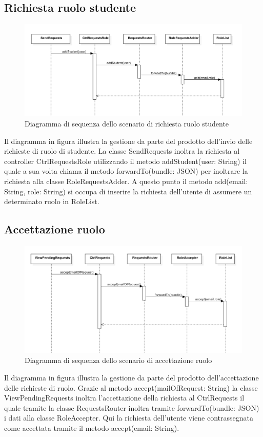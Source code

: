 \documentclass[a4paper, titlepage]{article}
\begin{document}
\newpage
\subsection{Richiesta ruolo studente}
\begin{figure}[!h]
	\centering
	\includegraphics[scale=0.5]{Img/seq-rolerequest.pdf}
	\caption{Diagramma di sequenza dello scenario di richiesta ruolo studente }
\end{figure}
Il diagramma in figura illustra la gestione da parte del prodotto dell'invio delle richieste di ruolo di studente. La classe SendRequests inoltra la richiesta al controller CtrlRequestsRole utilizzando il metodo addStudent(user: String) il quale a sua volta chiama il metodo forwardTo(bundle: JSON) per inoltrare la richiesta alla classe RoleRequestsAdder. A questo punto il metodo add(email: String, role: String) si occupa di inserire la richiesta dell'utente di assumere un determinato ruolo in RoleList.

\subsection{Accettazione ruolo}
\begin{figure}[!h]
	\centering
	\includegraphics[scale=0.5]{Img/seq-acceptrequest.pdf}
	\caption{Diagramma di sequenza dello scenario di accettazione ruolo}
\end{figure}
Il diagramma in figura illustra la gestione da parte del prodotto dell'accettazione delle richieste di ruolo. Grazie al metodo accept(mailOfRequest: String) la classe ViewPendingRequests inoltra l'accettazione della richiesta al CtrlRequests il quale tramite la classe RequestsRouter inoltra tramite forwardTo(bundle: JSON) i dati alla classe RoleAccepter. Qui la richiesta dell'utente viene contrassegnata come accettata tramite il metodo accept(email: String).
\end{document}
